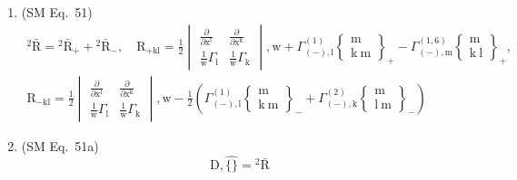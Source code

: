 \documentclass[12pt]{article}
\begin{document}
\begin{enumerate}[label=(\arabic*), series=formellist]
    \item (SM Eq.\ 51) 
    \[
    \begin{gathered}
    {}^2\bar{\mathrm{R}} = {}^2\bar{\mathrm{R}}_+ + {}^2\bar{\mathrm{R}}_-, \quad \mathrm{R}_{\mathrm{+kl}} = \frac{1}{2}\begin{vmatrix} \frac{\partial}{\partial \mathrm{x^l}} & \frac{\partial}{\partial \mathrm{x^k}} \\ \frac{1}{\mathrm{w}}\Gamma_\mathrm{l} & \frac{1}{\mathrm{w}}\Gamma_\mathrm{k} \end{vmatrix}, \mathrm{w} + \Gamma^{(1)}_{(-),\mathrm{l}} \left\{ \begin{smallmatrix} \mathrm{m} \\ \mathrm{k\ m} \end{smallmatrix} \right\} _+ - \Gamma^{(1,6)}_{(-),\mathrm{m}} \left\{ \begin{smallmatrix} \mathrm{m} \\ \mathrm{k\ l} \end{smallmatrix} \right\}_+, \\
    \mathrm{R}_{\mathrm{-kl}} = \frac{1}{2}\begin{vmatrix} \frac{\partial}{\partial \mathrm{x^l}} & \frac{\partial}{\partial \mathrm{x^k}} \\ \frac{1}{\mathrm{w}}\Gamma_\mathrm{l} & \frac{1}{\mathrm{w}}\Gamma_\mathrm{k} \end{vmatrix}, \mathrm{w} - \frac{1}{2}\left( \Gamma^{(1)}_{(-),\mathrm{l}} \left\{ \begin{smallmatrix} \mathrm{m} \\ \mathrm{k\ m} \end{smallmatrix} \right\}_- + \Gamma^{(2)}_{(-),\mathrm{k}} \left\{ \begin{smallmatrix} \mathrm{m} \\ \mathrm{l\ m} \end{smallmatrix} \right\}_- \right)
    \end{gathered}
    \]

    \item (SM Eq.\ 51a) 
    \[
    \mathrm{D}, \widehat{\{\}} = {}^2\bar{\mathrm{R}}
    \]


\end{enumerate}
\end{document}
